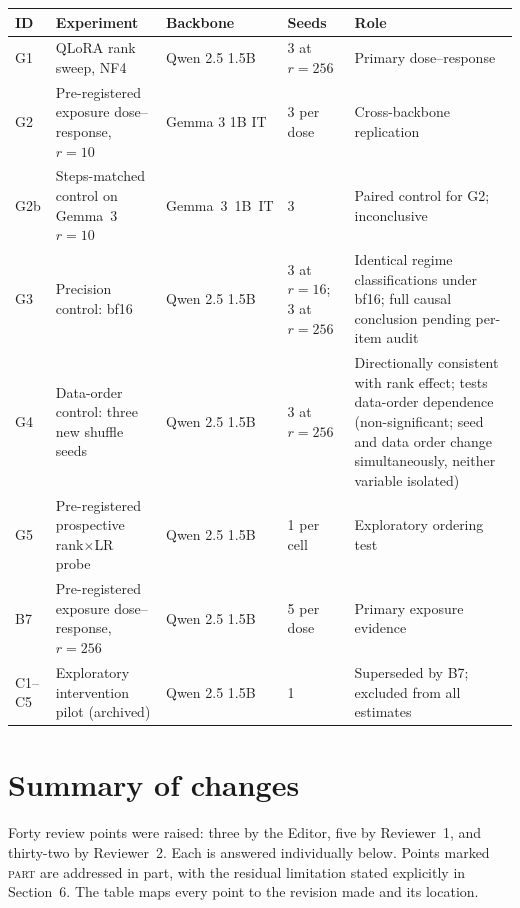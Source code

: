 \documentclass[11pt,a4paper]{article}
\begin{document}
\renewcommand{\arraystretch}{1.15}
\begin{tabular}{@{}L{1.3cm}L{4.6cm}L{2.5cm}L{1.6cm}L{3.3cm}@{}}
\toprule
{}\textbf{ID} & \textbf{Experiment} &
\textbf{Backbone} & \textbf{Seeds} & \textbf{Role} \\
\midrule
G1 & QLoRA rank sweep, NF4 & Qwen 2.5 1.5B & 3 at $r{=}256$ &
     Primary dose--response \\
G2 & Pre-registered exposure dose--response, $r{=}10$ &
     Gemma 3 1B IT & 3 per dose & Cross-backbone replication \\
G2b & Steps-matched control on Gemma~3 $r=10$ & Gemma~3~1B~IT & 3 & Paired control for G2; inconclusive \\
G3 & Precision control: bf16 & Qwen 2.5 1.5B & 3 at $r{=}16$; 3 at $r{=}256$ &
     Identical regime classifications under bf16; full causal conclusion pending per-item audit \\
G4 & Data-order control: three new shuffle seeds &
     Qwen 2.5 1.5B & 3 at $r{=}256$ & Directionally consistent with rank effect; tests data-order dependence (non-significant; seed and data order change simultaneously, neither variable isolated) \\
G5 & Pre-registered prospective rank$\times$LR probe &
     Qwen 2.5 1.5B & 1 per cell & Exploratory ordering test \\
B7 & Pre-registered exposure dose--response, $r{=}256$ &
     Qwen 2.5 1.5B & 5 per dose & Primary exposure evidence \\
C1--C5 & Exploratory intervention pilot (archived) &
     Qwen 2.5 1.5B & 1 & Superseded by B7; excluded from all estimates \\
\bottomrule
\end{tabular}

\section*{Summary of changes}

\noindent
Forty review points were raised: three by the Editor, five by
Reviewer~1, and thirty-two by Reviewer~2. Each is answered individually
below.
Points marked \textsc{part} are addressed in part, with the residual
limitation stated explicitly in Section~6.
The table maps every point to the revision made and its location.
\end{document}
